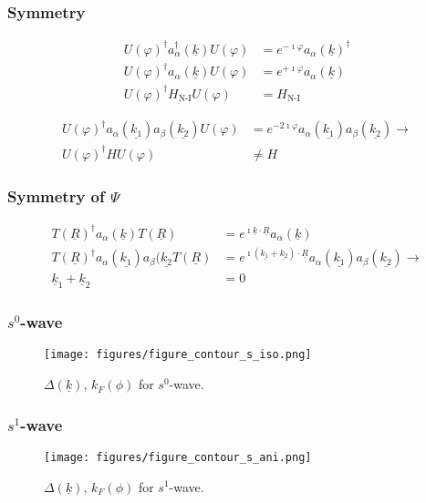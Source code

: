  
\begin{frame}
\frametitle{Symmetry}
\begin{align*}
U(\varphi)^\dagger a_\alpha^\dagger (\underline{k}) U(\varphi) &= e^{-\imath \varphi}a_\alpha (\underline{k})^\dagger \\
U(\varphi)^\dagger a_\alpha (\underline{k}) U(\varphi) &= e^{+\imath \varphi}a_\alpha (\underline{k}) \\
U(\varphi)^\dagger H_\text{N-I} U(\varphi) &= H_\text{N-I}
\end{align*}

\begin{align*}
U(\varphi)^\dagger a_\alpha (\underline{k_1}) a_\beta(\underline{k_2}) U(\varphi) &= e^{-2 \imath \varphi} a_\alpha (\underline{k_1}) a_\beta(\underline{k_2}) \rightarrow \\
U(\varphi)^\dagger H U(\varphi) &\neq H
\end{align*}
\end{frame}

\begin{frame}
\frametitle{Symmetry of $\Psi$} 
\begin{align*}
T(\underline{R})^\dagger a_\alpha(\underline{k}) T(\underline{R}) &= e^{\imath \underline{k}\cdot\underline{R}} a_\alpha(\underline{k}) \\ T(\underline{R})^\dagger a_\alpha (\underline{k_1}) a_\beta(\underline{k_2}T(\underline{R}) &= e^{\imath \left(\underline{k_1}+\underline{k_2}\right)\cdot\underline{R}}a_\alpha (\underline{k_1}) a_\beta(\underline{k_2}) \rightarrow \\
\underline{k}_1 + \underline{k}_2&=0
\end{align*}
\end{frame}


\begin{frame}
\frametitle{$s^0$-wave}
\begin{figure}
    \centering
    \texttt{[image: figures/figure\_contour\_s\_iso.png]}
    \caption{$\Delta(\underline{k})$, $k_F\left(\phi\right)$ for $s^0$-wave.}
\end{figure}
\end{frame}



\begin{frame}
\frametitle{$s^1$-wave}
\begin{figure}
    \centering
    \texttt{[image: figures/figure\_contour\_s\_ani.png]}
    \caption{$\Delta(\underline{k})$, $k_F\left(\phi\right)$ for $s^1$-wave.}
\end{figure}
\end{frame}



